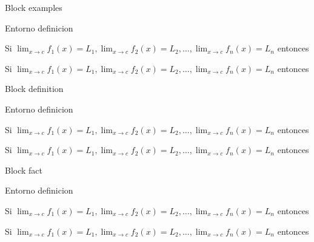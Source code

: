 \documentclass[]{beamer}
\theoremstyle{plain}
\begin{document}
\begin{frame}[fragile]{Block examples}
\begin{source}{Entorno definicion}{}
\begin{examples}
 Si \hspace{5pt}$\displaystyle \lim_{x\rightarrow c}f_1(x)=L_1, \displaystyle \lim_{x\rightarrow c}f_2(x)=L_2,\dots, \displaystyle \lim_{x\rightarrow c}f_n(x)=L_n $
 entonces
\end{examples}
\end{source}
\begin{examples}
 Si \hspace{5pt}$\displaystyle \lim_{x\rightarrow c}f_1(x)=L_1, \displaystyle \lim_{x\rightarrow c}f_2(x)=L_2,\dots, \displaystyle \lim_{x\rightarrow c}f_n(x)=L_n $
 entonces
\end{examples}
\end{frame}
\begin{frame}[fragile]{Block definition}
\begin{source}{Entorno definicion}{}
\begin{definition}
 Si \hspace{5pt}$\displaystyle \lim_{x\rightarrow c}f_1(x)=L_1, \displaystyle \lim_{x\rightarrow c}f_2(x)=L_2,\dots, \displaystyle \lim_{x\rightarrow c}f_n(x)=L_n $
 entonces
\end{definition}
\end{source}
\begin{definition}
 Si \hspace{5pt}$\displaystyle \lim_{x\rightarrow c}f_1(x)=L_1, \displaystyle \lim_{x\rightarrow c}f_2(x)=L_2,\dots, \displaystyle \lim_{x\rightarrow c}f_n(x)=L_n $
 entonces
\end{definition}
\end{frame}
\begin{frame}[fragile]{Block fact}
\begin{source}{Entorno definicion}{}
\begin{fact}
 Si \hspace{5pt}$\displaystyle \lim_{x\rightarrow c}f_1(x)=L_1, \displaystyle \lim_{x\rightarrow c}f_2(x)=L_2,\dots, \displaystyle \lim_{x\rightarrow c}f_n(x)=L_n $
 entonces
\end{fact}
\end{source}
\begin{fact}
 Si \hspace{5pt}$\displaystyle \lim_{x\rightarrow c}f_1(x)=L_1, \displaystyle \lim_{x\rightarrow c}f_2(x)=L_2,\dots, \displaystyle \lim_{x\rightarrow c}f_n(x)=L_n $
 entonces
\end{fact}
\end{frame}
\end{document}
